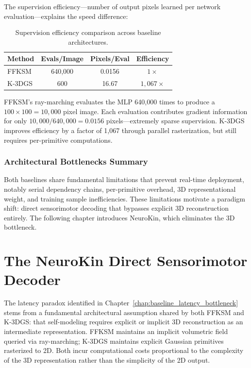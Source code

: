 \documentclass[12pt,a4paper,oneside]{report}
\begin{document}
The supervision efficiency---number of output pixels learned per network evaluation---explains the speed difference:

\begin{table}[H]
\centering
\caption{Supervision efficiency comparison across baseline architectures.}
\label{tab:supervision_efficiency_baseline}
\begin{tabular}{lccc}
\toprule
\textbf{Method} & \textbf{Evals/Image} & \textbf{Pixels/Eval} & \textbf{Efficiency} \\
\midrule
FFKSM & 640,000 & 0.0156 & $1\times$ \\
K-3DGS & 600 & 16.67 & $1,067\times$ \\
\bottomrule
\end{tabular}
\end{table}

FFKSM's ray-marching evaluates the MLP 640,000 times to produce a $100 \times 100 = 10,000$ pixel image. Each evaluation contributes gradient information for only $10,000 / 640,000 = 0.0156$ pixels---extremely sparse supervision. K-3DGS improves efficiency by a factor of 1,067 through parallel rasterization, but still requires per-primitive computations.

\subsection{Architectural Bottlenecks Summary}

Both baselines share fundamental limitations that prevent real-time deployment, notably serial dependency chains, per-primitive overhead, 3D representational weight, and training sample inefficiencies. These limitations motivate a paradigm shift: direct sensorimotor decoding that bypasses explicit 3D reconstruction entirely. The following chapter introduces NeuroKin, which eliminates the 3D bottleneck.

\clearpage

\chapter{The NeuroKin Direct Sensorimotor Decoder}
\label{chap:neurokin_decoder}

The latency paradox identified in Chapter~\ref{chap:baseline_latency_bottleneck} stems from a fundamental architectural assumption shared by both FFKSM and K-3DGS: that self-modeling requires explicit or implicit 3D reconstruction as an intermediate representation. FFKSM maintains an implicit volumetric field queried via ray-marching; K-3DGS maintains explicit Gaussian primitives rasterized to 2D. Both incur computational costs proportional to the complexity of the 3D representation rather than the simplicity of the 2D output.
\end{document}
